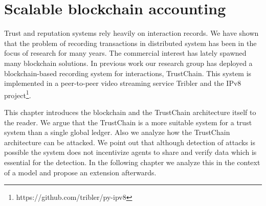 \chapter{Scalable blockchain accounting}
\label{chap:implementation}

Trust and reputation systems rely heavily on interaction records. We have shown that the problem 
of recording transactions in distributed system has been in the focus of research for many years. 
The commercial interest has lately spawned many blockchain solutions. In previous work our 
research group has deployed a blockchain-based recording system for interactions, TrustChain. This system is 
implemented in a peer-to-peer video streaming service Tribler and the IPv8 project\footnote{https://github.com/tribler/py-ipv8}. 

This chapter introduces the blockchain and the TrustChain architecture itself to the reader. We argue
that the TrustChain is a more suitable system for a trust system than a single global ledger.
Also we analyze how the TrustChain architecture can be attacked. We point
out that although detection of attacks is possible the system does not incentivize agents to share 
and verify data which is essential for the detection. In the following chapter we analyze this in the
context of a model and propose an extension afterwards. 







